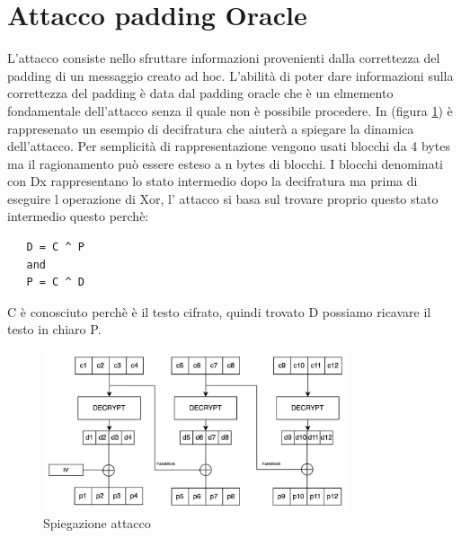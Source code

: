 \section{Attacco padding Oracle}

L'attacco consiste nello sfruttare informazioni provenienti dalla correttezza del padding di un messaggio creato ad hoc.
L'abilità di poter dare informazioni sulla correttezza del padding è data dal padding oracle che è un elmemento 
fondamentale dell'attacco senza il quale non è possibile procedere.
In (figura \ref{fig:attack_1}) è rappresenato un esempio di decifratura che aiuterà a spiegare la dinamica dell'attacco.
Per semplicità di rappresentazione vengono usati blocchi da 4 bytes ma il ragionamento può essere esteso a n bytes di blocchi.
I blocchi denominati con Dx rappresentano lo stato intermedio dopo la decifratura ma prima di eseguire l operazione di Xor, l' attacco si basa sul trovare proprio questo stato intermedio questo perchè:

\begin{verbatim}
   D = C ^ P 
   and 
   P = C ^ D
\end{verbatim}
C è conosciuto perchè è il testo cifrato, quindi trovato D possiamo ricavare il testo in chiaro P.

\begin{figure}[h!]
    \includegraphics[width=0.8\textwidth]{img/attack.jpeg}
    \centering
    \caption{Spiegazione attacco}
    \label{fig:attack_1}
\end{figure}

